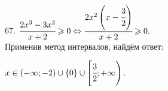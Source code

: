 67. $\cfrac{2x^3-3x^2}{x+2}\geqslant0\Leftrightarrow\cfrac{2x^2\left(x-\cfrac{3}{2}\right)}{x+2}\geqslant0.$\\ Применив метод интервалов, найдём ответ:
\begin{figure}[ht!]
\end{figure}
$x\in\left(-\infty;-2\right)\cup\{0\}\cup\left[\cfrac{3}{2};+\infty\right).$\\
